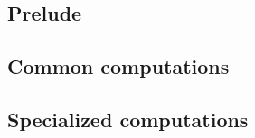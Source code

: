 \subsection{Prelude}                     \label{user txn data: processing: user: prelude}                        
\subsection{Common computations}         \label{user txn data: processing: user: common computations}            
\subsection{Specialized computations}    \label{user txn data: processing: user: specialized computations}       

